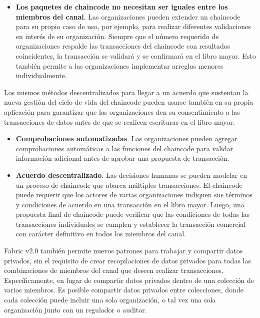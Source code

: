 {\begin{itemize}
\item {\bf Los paquetes de chaincode no necesitan ser iguales entre los miembros del canal}. Las organizaciones pueden extender un chaincode para su propio caso de uso, por ejemplo, para realizar diferentes validaciones en inter\'es de su organizaci\'on. Siempre que el n\'umero requerido de organizaciones respalde las transacciones del chaincode con resultados coincidentes, la transacci\'on se validar\'a y se confirmar\'a en el libro mayor. Esto tambi\'en permite a las organizaciones implementar arreglos menores individualmente.
\end{itemize}

Los mismos m\'etodos descentralizados para llegar a un acuerdo que sustentan la nueva gesti\'on del ciclo de vida del chaincode pueden usarse tambi\'en en su propia aplicaci\'on para garantizar que las organizaciones den su consentimiento a las transacciones de datos antes de que se realicen escrituras en el libro mayor.\\

\begin{itemize}
\item {\bf Comprobaciones automatizadas}. Las organizaciones pueden agregar comprobaciones autom\'aticas a las funciones del chaincode para validar informaci\'on adicional antes de aprobar una propuesta de transacci\'on.

\item {\bf Acuerdo descentralizado}. Las decisiones humanas se pueden modelar en un proceso de chaincode que abarca m\'ultiples transacciones. El chaincode puede requerir que los actores de varias organizaciones indiquen sus t\'erminos y condiciones de acuerdo en una transacci\'on en el libro mayor. Luego, una propuesta final de chaincode puede verificar que las condiciones de todas las transacciones individuales se cumplen y establecer la transacci\'on comercial con car\'acter definitivo en todos los miembros del canal.
\end{itemize}

Fabric v2.0 tambi\'en permite nuevos patrones para trabajar y compartir datos privados, sin el requisito de crear recopilaciones de datos privados para todas las combinaciones de miembros del canal que deseen realizar transacciones. Espec\'ificamente, en lugar de compartir datos privados dentro de una colecci\'on de varios miembros. Es posible compartir datos privados entre colecciones, donde cada colecci\'on puede incluir una sola organizaci\'on, o tal vez una sola organizaci\'on junto con un regulador o auditor.\\

}
